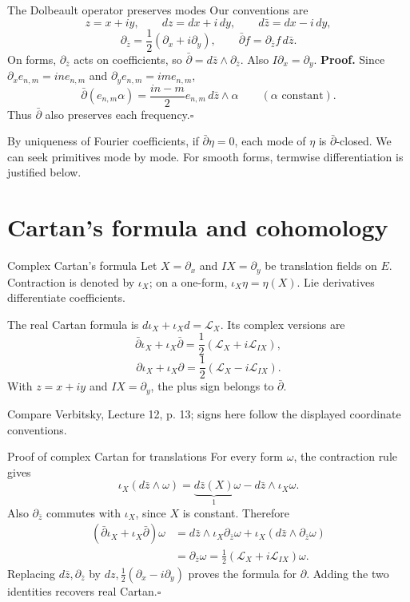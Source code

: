 \documentclass[aspectratio=169,11pt]{beamer}
\newcommand{\db}{\bar\partial}
\newcommand{\Lie}{\mathcal L}
\newcommand{\ee}{e_{n,m}}
\newcommand{\pbarz}{\partial_{\bar z}}
\newcommand{\src}[1]{\par\vfill{\scriptsize #1\par}}
\begin{document}
\begin{frame}{The Dolbeault operator preserves modes}
Our conventions are
\[
 z=x+iy,\qquad dz=dx+i\,dy,\qquad d\bar z=dx-i\,dy,
\]
\[
 \pbarz=\frac12(\partial_x+i\partial_y),\qquad
 \db f=\pbarz f\,d\bar z.
\]
On forms, $\pbarz$ acts on coefficients, so $\db=d\bar z\wedge\pbarz$.
Also $I\partial_x=\partial_y$.
\textbf{Proof.} Since $\partial_x\ee=in\ee$ and
$\partial_y\ee=im\ee$,
\[
 \db(\ee\alpha)=\frac{in-m}{2}\ee\,d\bar z\wedge\alpha
 \qquad(\alpha\text{ constant}).
\]
Thus $\db$ also preserves each frequency.\hfill$\square$

By uniqueness of Fourier coefficients, if $\db\eta=0$,
each mode of $\eta$ is $\db$-closed. We can seek primitives mode by mode.
For smooth forms, termwise differentiation is justified below.
\end{frame}

\section{Cartan's formula and cohomology}
\begin{frame}{Complex Cartan's formula}
Let $X=\partial_x$ and $IX=\partial_y$ be translation fields on $E$.
Contraction is denoted by $\iota_X$; on a one-form,
$\iota_X\eta=\eta(X)$. Lie derivatives differentiate coefficients.

The real Cartan formula is $d\iota_X+\iota_Xd=\Lie_X$.
Its complex versions are
\[
 \db\iota_X+\iota_X\db
 =\frac12(\Lie_X+i\Lie_{IX}),
\]
\[
 \partial\iota_X+\iota_X\partial
 =\frac12(\Lie_X-i\Lie_{IX}).
\]
With $z=x+iy$ and $IX=\partial_y$, the plus sign belongs to $\db$.
\src{Compare Verbitsky, Lecture 12, p. 13; signs here follow the displayed coordinate conventions.}
\end{frame}

\begin{frame}{Proof of complex Cartan for translations}
For every form $\omega$, the contraction rule gives
\[
 \iota_X(d\bar z\wedge\omega)
 =\underbrace{d\bar z(X)}_{1}\omega-d\bar z\wedge\iota_X\omega.
\]
Also $\pbarz$ commutes with $\iota_X$, since $X$ is constant. Therefore
\begin{align*}
 (\db\iota_X+\iota_X\db)\omega
 &=d\bar z\wedge\iota_X\pbarz\omega
   +\iota_X(d\bar z\wedge\pbarz\omega)\\
 &=\pbarz\omega
 =\tfrac12(\Lie_X+i\Lie_{IX})\omega.
\end{align*}
Replacing $d\bar z,\pbarz$ by $dz,\tfrac12(\partial_x-i\partial_y)$
proves the formula for $\partial$.
Adding the two identities recovers real Cartan.\hfill$\square$
\end{frame}
\end{document}
